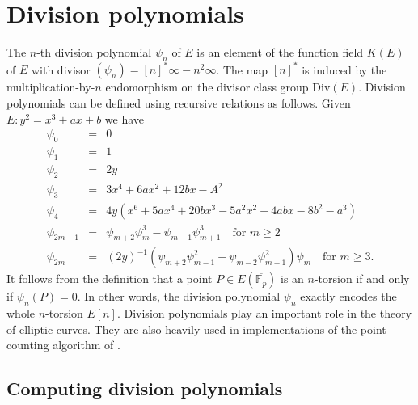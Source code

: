 \documentclass[review]{elsarticle}
\theoremstyle{plain}
\theoremstyle{definition}
\def\F{\ensuremath{\mathbb{F}}}
\begin{document}


\section{Division polynomials}
\label{sec:divpoly}

The $n$-th division polynomial $\psi_n$ of $E$ is an element of the function field $K(E)$ of $E$ 
with divisor $(\psi_n) = [n]^*\infty - n^2\infty$. The map $[n]^*$ is induced by the 
multiplication-by-$n$ endomorphism on the divisor class group $\text{Div}(E)$. Division polynomials 
can be defined using recursive relations as follows. Given $E: y^2 = x^3 + ax + b$ we have
\begin{equation}
\label{equ:divpoly1}
	\begin{array}{rll}
		\psi_0 & = & 0 \\
		\psi_1 & = & 1 \\
		\psi_2 & = & 2y \\
		\psi_3 & = & 3x^4 + 6ax^2 + 12bx - A^2 \\
		\psi_4 & = & 4y(x^6 + 5ax^4 + 20bx^3 - 5a^2x^2 - 4abx - 8b^2 - a^3) \\
		\psi_{2m + 1} & = & \psi_{m + 2}\psi_m^3 - \psi_{m - 1}\psi_{m + 1}^3 \quad \text{for } m 
		\ge 2 \\
		\psi_{2m} & = & (2y)^{-1}(\psi_{m + 2}\psi_{m - 1}^2 - \psi_{m - 2}\psi_{m + 1}^2)\psi_m 
		\quad \text{for } m \ge 3.
	\end{array}
\end{equation}
It follows from the definition that a point $P \in E(\overline{\F_p})$ is an $n$-torsion if and 
only if $\psi_n(P) = 0$. In other words, the division polynomial $\psi_n$ exactly encodes the whole 
$n$-torsion $E[n]$. Division polynomials play an important role in the theory of elliptic 
curves. They are also heavily used in implementations of the point counting algorithm of 
\cite{schoof85}. 


\subsection{Computing division polynomials}
\end{document}
